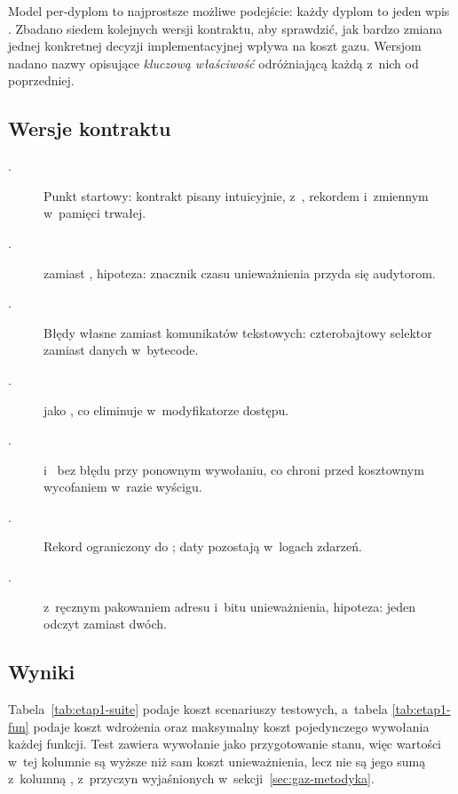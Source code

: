 Model per-dyplom to najprostsze możliwe podejście: każdy dyplom to jeden wpis
. Zbadano siedem kolejnych wersji kontraktu, aby
sprawdzić, jak bardzo zmiana jednej konkretnej decyzji implementacyjnej wpływa na
koszt gazu. Wersjom nadano nazwy opisujące \emph{kluczową właściwość}
odróżniającą każdą z~nich od poprzedniej.

\subsection{Wersje kontraktu}

\begin{description}
  \item[.] Punkt startowy: kontrakt pisany intuicyjnie,
        z~, rekordem
         i~zmiennym
         w~pamięci trwałej.
  \item[.]  zamiast ,
        hipoteza: znacznik czasu unieważnienia przyda się audytorom.
  \item[.] Błędy własne zamiast komunikatów tekstowych:
        czterobajtowy selektor zamiast danych w~bytecode.
  \item[.]  jako , co eliminuje
         w~modyfikatorze dostępu.
  \item[.]  i~ bez błędu przy
        ponownym wywołaniu, co chroni przed kosztownym wycofaniem w~razie wyścigu.
  \item[.] Rekord ograniczony do
        ; daty pozostają w~logach zdarzeń.
  \item[.]  z~ręcznym
        pakowaniem adresu i~bitu unieważnienia, hipoteza: jeden odczyt zamiast
        dwóch.
\end{description}

\subsection{Wyniki}

Tabela~\ref{tab:etap1-suite} podaje koszt scenariuszy testowych, a~tabela
\ref{tab:etap1-fun} podaje koszt wdrożenia oraz maksymalny koszt pojedynczego
wywołania każdej funkcji. Test  zawiera wywołanie
 jako przygotowanie stanu, więc wartości w~tej kolumnie są wyższe niż
sam koszt unieważnienia, lecz nie są jego sumą z~kolumną ,
z~przyczyn wyjaśnionych w~sekcji~\ref{sec:gaz-metodyka}.

